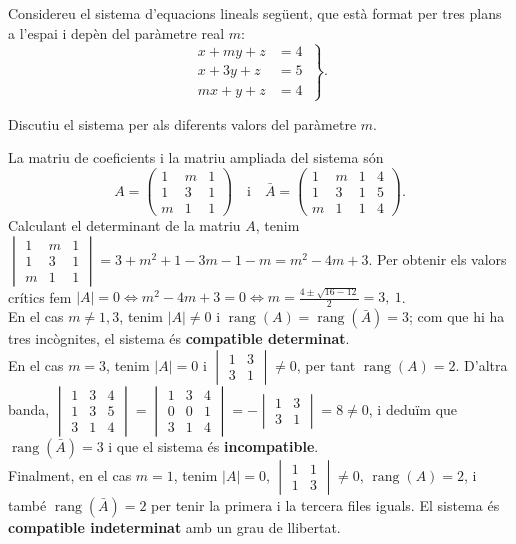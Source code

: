 Considereu el sistema d'equacions lineals següent, que està format per tres plans a l'espai
i depèn del paràmetre real $m$:
\[
\left.\begin{aligned}
x+my+z&=4\\
x+3y+z&=5\\
mx+y+z&=4
\end{aligned}\ \right\}.
\]

\begin{apartats}

Discutiu el sistema per als diferents valors del paràmetre $m$.

\begin{solucio}
La matriu de coeficients i la matriu ampliada del sistema són
\[
A=\begin{pmatrix}1&m&1\\1&3&1\\m&1&1\end{pmatrix}
\quad\text{i}\quad
\bar A=\left(\begin{array}{ccc|c}1&m&1&4\\1&3&1&5\\m&1&1&4\end{array}\right).
\]
Calculant el determinant de la matriu $A$, tenim
$\begin{vmatrix}1&m&1\\1&3&1\\m&1&1\end{vmatrix}=3+m^2+1-3m-1-m=m^2-4m+3$.
Per obtenir els valors crítics fem
$|A|=0\iff m^2-4m+3=0\iff m=\frac{4\pm\sqrt{16-12}}{2}=3,\ 1$.\\
En el cas $m\neq1,3$, tenim $|A|\neq0$ i $\operatorname{rang}(A)=\operatorname{rang}(\bar A)=3$;
com que hi ha tres incògnites, el sistema és \textbf{compatible determinat}.\\
En el cas $m=3$, tenim $|A|=0$ i $\begin{vmatrix}1&3\\3&1\end{vmatrix}\neq0$, per tant
$\operatorname{rang}(A)=2$. D'altra banda,
$\begin{vmatrix}1&3&4\\1&3&5\\3&1&4\end{vmatrix}=\begin{vmatrix}1&3&4\\0&0&1\\3&1&4\end{vmatrix}
=-\begin{vmatrix}1&3\\3&1\end{vmatrix}=8\neq0$,
i deduïm que $\operatorname{rang}(\bar A)=3$ i que el sistema és \textbf{incompatible}.\\
Finalment, en el cas $m=1$, tenim $|A|=0$, $\begin{vmatrix}1&1\\1&3\end{vmatrix}\neq0$,
$\operatorname{rang}(A)=2$, i també $\operatorname{rang}(\bar A)=2$ per tenir la primera i
la tercera files iguals. El sistema és \textbf{compatible indeterminat} amb un grau de
llibertat.


\end{solucio}
\end{apartats}
